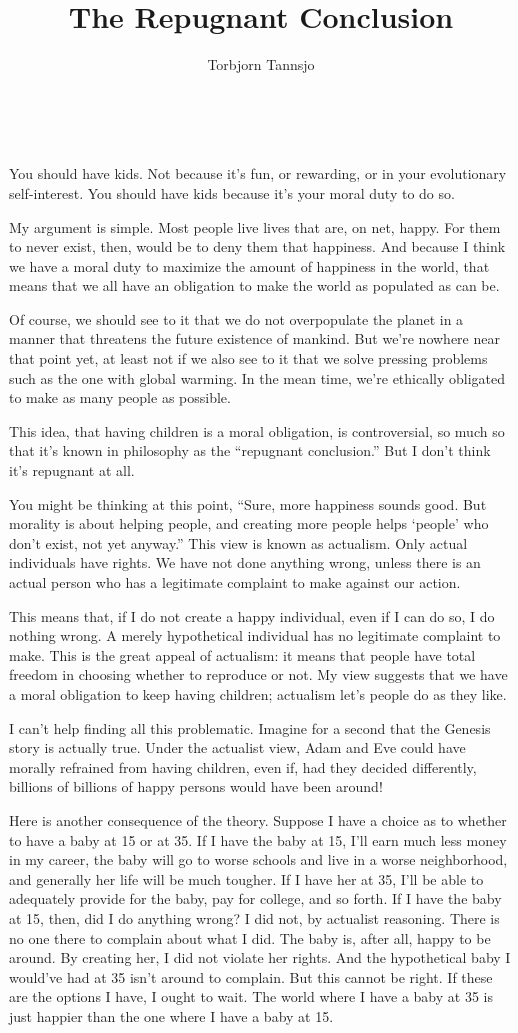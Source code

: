 \documentclass[9pt]{article}
\author{Torbjorn Tannsjo}
\date{ \ }
\title{The Repugnant Conclusion}
\begin{document}
You should have kids. Not because it's fun, or rewarding, or in your
evolutionary self-interest. You should have kids because it's your moral
duty to do so.

My argument is simple. Most people live lives that are, on net, happy.
For them to never exist, then, would be to deny them that happiness. And
because I think we have a moral duty to maximize the amount of happiness
in the world, that means that we all have an obligation to make the
world as populated as can be.

Of course, we should see to it that we do not overpopulate the planet in
a manner that threatens the future existence of mankind. But we're
nowhere near that point yet, at least not if we also see to it that we
solve pressing problems such as the one with global warming. In the mean
time, we're ethically obligated to make as many people as possible.

This idea, that having children is a moral obligation, is controversial,
so much so that it's known in philosophy as the ``repugnant
conclusion.'' But I don't think it's repugnant at all.

You might be thinking at this point, ``Sure, more happiness sounds good.
But morality is about helping people, and creating more people helps
`people' who don't exist, not yet anyway.'' This view is known as
actualism. Only actual individuals have rights. We have not done
anything wrong, unless there is an actual person who has a legitimate
complaint to make against our action.

This means that, if I do not create a happy individual, even if I can do
so, I do nothing wrong. A merely hypothetical individual has no
legitimate complaint to make. This is the great appeal of actualism: it
means that people have total freedom in choosing whether to reproduce or
not. My view suggests that we have a moral obligation to keep having
children; actualism let's people do as they like.

I can't help finding all this problematic. Imagine for a second that the
Genesis story is actually true. Under the actualist view, Adam and Eve
could have morally refrained from having children, even if, had they
decided differently, billions of billions of happy persons would have
been around!

Here is another consequence of the theory. Suppose I have a choice as to
whether to have a baby at 15 or at 35. If I have the baby at 15, I'll
earn much less money in my career, the baby will go to worse schools and
live in a worse neighborhood, and generally her life will be much
tougher. If I have her at 35, I'll be able to adequately provide for the
baby, pay for college, and so forth. If I have the baby at 15, then, did
I do anything wrong? I did not, by actualist reasoning. There is no one
there to complain about what I did. The baby is, after all, happy to be
around. By creating her, I did not violate her rights. And the
hypothetical baby I would've had at 35 isn't around to complain. But
this cannot be right. If these are the options I have, I ought to wait.
The world where I have a baby at 35 is just happier than the one where I
have a baby at 15.
\end{document}
